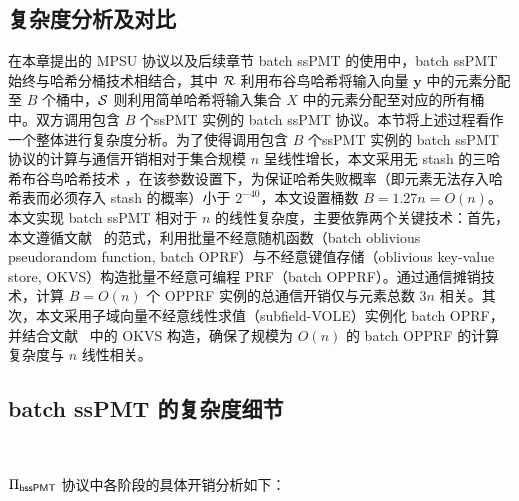 \subsection{复杂度分析及对比}

在本章提出的 MPSU 协议以及后续章节 batch ssPMT 的使用中，batch ssPMT 始终与哈希分桶技术相结合，其中 $\mathcal{R}$ 利用布谷鸟哈希将输入向量 $\textbf{y}$ 中的元素分配至 $B$ 个桶中，$\mathcal{S}$ 则利用简单哈希将输入集合 $X$ 中的元素分配至对应的所有桶中。双方调用包含 $B$ 个ssPMT 实例的 batch ssPMT 协议。本节将上述过程看作一个整体进行复杂度分析。为了使得调用包含 $B$ 个ssPMT 实例的 batch ssPMT 协议的计算与通信开销相对于集合规模 $n$ 呈线性增长，本文采用无 stash 的三哈希布谷鸟哈希技术 \cite{PSTY-EUROCRYPT-2019}，在该参数设置下，为保证哈希失败概率（即元素无法存入哈希表而必须存入 stash 的概率）小于 $2^{-40}$，本文设置桶数 $B = 1.27n = O(n)$。本文实现 batch ssPMT 相对于 $n$ 的线性复杂度，主要依靠两个关键技术：首先，本文遵循文献~\cite{PSTY-EUROCRYPT-2019} 的范式，利用批量不经意随机函数（batch oblivious pseudorandom function, batch OPRF）与不经意键值存储（oblivious key-value store, OKVS）构造批量不经意可编程 PRF（batch OPPRF）。通过通信摊销技术，计算 $B = O(n)$ 个 OPPRF 实例的总通信开销仅与元素总数 $3n$ 相关。其次，本文采用子域向量不经意线性求值（subfield-VOLE）实例化 batch OPRF，并结合文献~\cite{RR-CCS-2022} 中的 OKVS 构造，确保了规模为 $O(n)$ 的 batch OPPRF 的计算复杂度与 $n$ 线性相关。

\subsection{batch ssPMT 的复杂度细节}~\label{sec:analysis-bsspmt}

$\Pi_\mathsf{bssPMT}$ 协议中各阶段的具体开销分析如下：

